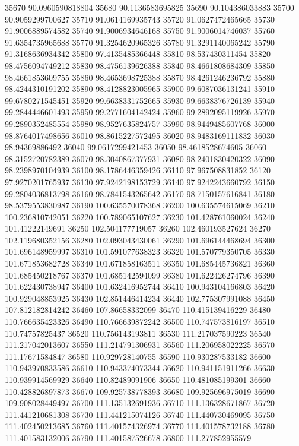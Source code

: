 {35670 90.0960590818804
35680 90.1136583695825
35690 90.104386033883
35700 90.9059299700627
35710 91.0614169935743
35720 91.0627472465665
35730 91.9006889574582
35740 91.9006934646168
35750 91.9006014746037
35760 91.6354735965688
35770 91.3254620965326
35780 91.3291140065242
35790 91.3168636934342
35800 97.4135485366448
35810 98.537430311454
35820 98.4756094749212
35830 98.4756139626388
35840 98.4661808684309
35850 98.4661853609755
35860 98.4653698725388
35870 98.4261246236792
35880 98.4244310191202
35890 98.4128823005965
35900 99.6087036131241
35910 99.6780271545451
35920 99.6638331752665
35930 99.6638376726139
35940 99.2844446601493
35950 99.2771604142424
35960 99.2892095119926
35970 99.2890352485554
35980 98.9527635824757
35990 98.9449485607768
36000 98.8764017498656
36010 98.8615227572495
36020 98.9483169111832
36030 98.94369886492
36040 99.0617299421453
36050 98.4618528674605
36060 98.3152720782389
36070 98.3040867377931
36080 98.2401830420322
36090 98.2398970104939
36100 98.1786446359426
36110 97.967508831852
36120 97.9270201765937
36130 97.9242198153729
36140 97.9242243660792
36150 99.2804036813798
36160 98.7841543265642
36170 98.7150157616841
36180 98.5379553830987
36190 100.635570078368
36200 100.635574615069
36210 100.236810742051
36220 100.789065107627
36230 101.428761060024
36240 101.41222149691
36250 102.504177719057
36260 102.460193527624
36270 102.119680352156
36280 102.093043430061
36290 101.696144468694
36300 101.696148959997
36310 101.591077638323
36320 101.570779350705
36330 101.671853682728
36340 101.671858163511
36350 101.685445736821
36360 101.685450218767
36370 101.685142594099
36380 101.622426274796
36390 101.622430738947
36400 101.632416952744
36410 100.943104166803
36420 100.929048853925
36430 102.851446414234
36440 102.775307991088
36450 107.812182814242
36460 107.86658332099
36470 110.415139416229
36480 110.766635423326
36490 110.766639872242
36500 110.747573816197
36510 110.74757825437
36520 110.756143193811
36530 111.217037590223
36540 111.217042013607
36550 111.214791306931
36560 111.206958022225
36570 111.17671584847
36580 110.929728140755
36590 110.930287533182
36600 110.943970833586
36610 110.943374073344
36620 110.941151911266
36630 110.939914569929
36640 110.82489091906
36650 110.481085199301
36660 110.428826897873
36670 109.925738778393
36680 109.925696975019
36690 109.908028449497
36700 111.135132691936
36710 111.136328671867
36720 111.441210681308
36730 111.441215074126
36740 111.440730469095
36750 111.402450213685
36760 111.401574326974
36770 111.401578732188
36780 111.401583132006
36790 111.401587526678
36800 111.277852955579
}
